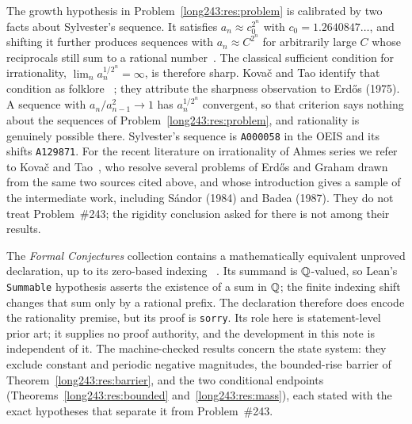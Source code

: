 \documentclass[11pt]{article}
\begin{document}
The growth hypothesis in Problem~\ref{long243:res:problem} is calibrated by two facts
about Sylvester's sequence.  It satisfies $a_n\approx c_0^{2^{n}}$ with
$c_0=1.2640847\ldots$, and shifting it further produces sequences with
$a_n\approx C^{2^{n}}$ for arbitrarily large $C$ whose reciprocals still sum
to a rational number~\cite[arXiv v4, p.~2]{kovactao2024}.  The classical sufficient
condition for irrationality, $\lim_n a_n^{1/2^{n}}=\infty$, is therefore
sharp.  Kova\v{c} and Tao identify that condition as folklore
~\cite[arXiv v4, p.~2]{kovactao2024}; they attribute the sharpness observation to
Erd\H{o}s (1975).  A sequence with
$a_n/a_{n-1}^{2}\to1$ has $a_n^{1/2^{n}}$
convergent, so that criterion says nothing about the sequences of
Problem~\ref{long243:res:problem}, and rationality is genuinely possible there.
Sylvester's
sequence is \texttt{A000058} in the OEIS and its shifts \texttt{A129871}.  For
the recent literature on irrationality of Ahmes series we refer to Kova\v{c}
and Tao~\cite{kovactao2024}, who resolve several problems of Erd\H{o}s and
Graham drawn from the same two sources cited above, and whose introduction
gives a sample of the intermediate work, including S\'andor (1984) and Badea
(1987).  They do not treat Problem~\#243; the rigidity conclusion asked for
there is not among their results.

The \emph{Formal Conjectures} collection contains a mathematically equivalent
unproved declaration, up to its zero-based indexing
~\cite{formalconjectures243}.  Its summand is $\mathbb{Q}$-valued, so Lean's
\texttt{Summable} hypothesis asserts the existence of a sum in $\mathbb{Q}$; the
finite indexing shift changes that sum only by a rational prefix.  The
declaration therefore does encode the rationality premise, but its proof is
\texttt{sorry}.  Its role here is statement-level prior art; it supplies no
proof authority, and the development in this note is independent of it.
The machine-checked results concern the state system: they exclude constant and
periodic negative magnitudes, the bounded-rise barrier of
Theorem~\ref{long243:res:barrier}, and the two conditional endpoints
(Theorems~\ref{long243:res:bounded} and~\ref{long243:res:mass}), each stated with the exact
hypotheses that separate it from Problem~\#243.

\statusboundary
\end{document}
